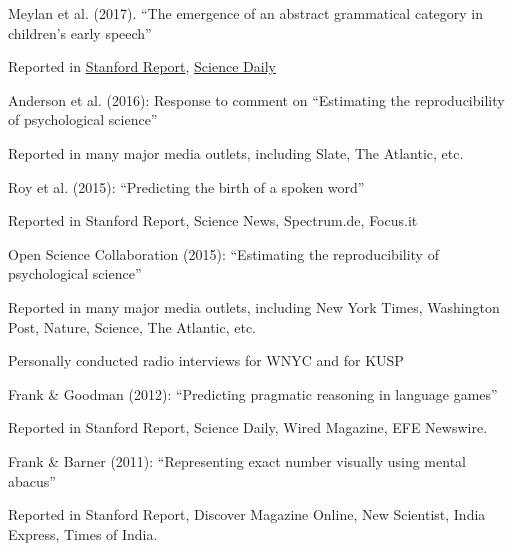 \documentclass{article}
\renewenvironment{itemize}{
\begin{list}{}{
  \setlength{\leftmargin}{1.5em}
  }
  }{
\end{list}
}
\begin{document}
\begin{itemize}
\begin{itemize}
  \item Meylan et al. (2017). ``The emergence of an abstract grammatical category in children's early speech''
  \begin{itemize}
    \item Reported in \href{https://news.stanford.edu/2017/02/22/new-research-toddlers-grammar-skills-learned-not-innate/}{Stanford Report}, \href{https://www.sciencedaily.com/releases/2017/04/170406091544.htm}{Science Daily}
  \end{itemize}

  \item Anderson et al. (2016): Response to comment on ``Estimating the reproducibility of psychological science''
  \begin{itemize}
    \item Reported in many major media outlets, including Slate, The Atlantic, etc.
  \end{itemize}

  \item Roy et al. (2015): ``Predicting the birth of a spoken word''
  \begin{itemize}
    \item Reported in Stanford Report, Science News, Spectrum.de, Focus.it
  \end{itemize}

  \item Open Science Collaboration (2015): ``Estimating the reproducibility of psychological science''
  \begin{itemize}
    \item Reported in many major media outlets, including New York Times, Washington Post, Nature, Science, The Atlantic, etc.
    \item Personally conducted radio interviews for WNYC and for KUSP
  \end{itemize}

  \item Frank \& Goodman (2012): ``Predicting pragmatic reasoning in language games''
  \begin{itemize}
    \item Reported in Stanford Report, Science Daily, Wired Magazine, EFE Newswire.
  \end{itemize}

  \item Frank \& Barner (2011): ``Representing exact number visually using mental abacus''
  \begin{itemize}
    \item Reported in Stanford Report, Discover Magazine Online, New Scientist, India Express, Times of India.
  \end{itemize}


\end{itemize}
\end{itemize}
\end{document}
